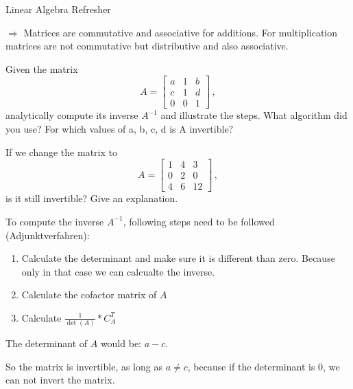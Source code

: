 \documentclass[
	english,
        solution=true
	]{tudaexercise}
\begin{document}
\begin{task}[points=28]{Linear Algebra Refresher}
\begin{subtask}[points=5,title=Matrix Properties]
\begin{solution}
\begin{enumerate}
\end{enumerate}

$\Rightarrow$ Matrices are commutative and associative for additions. For multiplication matrices are not commutative but distributive and also associative.

\end{solution}
\end{subtask}


\begin{subtask}[points=7,title=Matrix Inversion]

Given the matrix
\begin{equation*}
     A = \begin{bmatrix}
     a & 1 & b \\
     c & 1 & d \\
     0 & 0 & 1 \end{bmatrix} \,,
\end{equation*}
analytically compute its inverse $ A^{-1}$ and illustrate the steps. What algorithm did you use?
For which values of a, b, c, d is A invertible?

If we change the matrix to
\begin{equation*}
     A = \begin{bmatrix}
     1 & 4 & 3 \\
     0 & 2 & 0 \\
     4 & 6 & 12 \end{bmatrix} \,,
\end{equation*}
is it still invertible? Give an explanation.

\begin{solution}

To compute the inverse $A^{-1}$, following steps need to be followed (Adjunktverfahren):
\begin{enumerate}
    \item Calculate the determinant and make sure it is different than zero. Because only in that case we can calcualte the inverse.
    \item Calculate the cofactor matrix of $A$
    \item Calculate $\frac{1}{\det(A)}*C_A^T$
\end{enumerate}

The determinant of $A$ would be: $a-c$.

So the matrix is invertible, as long as $a \ne c$, because if the determinant is $0$, we can not invert the matrix.\\


\end{solution}
\end{subtask}
\end{task}
\end{document}
